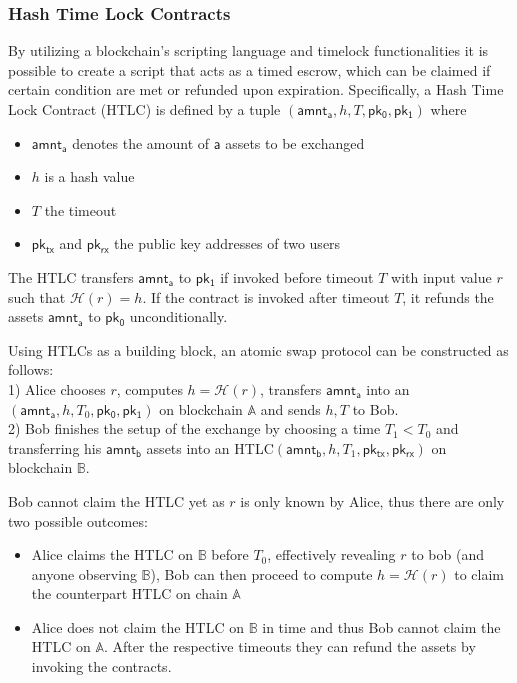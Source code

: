 \documentclass{article}      	%
\begin{document}
\subsubsection{Hash Time Lock Contracts}

By utilizing a blockchain's scripting language and timelock functionalities it is possible to create a script that acts as a timed escrow, which can be claimed if certain condition are met or refunded upon expiration.
Specifically, a Hash Time Lock Contract (HTLC) is defined by a tuple $(\mathsf{amnt_a}, h, T, \mathsf{pk_0}, \mathsf{pk_1})$ where 
\begin{itemize}
	\item $\mathsf{amnt_a}$ denotes the amount of $\mathsf{a}$ assets to be exchanged
	\item $h$ is a hash value
	\item $T$ the timeout
	\item $\mathsf{pk_{tx}}$ and $\mathsf{pk_{rx}}$ the public key addresses of two users
\end{itemize}

The HTLC transfers $\mathsf{amnt_a}$ to $\mathsf{pk_1}$ if invoked before timeout $T$ with input value $r$ such that $\mathcal{H}(r) = h$. 
If the contract is invoked after timeout $T$, it refunds the assets $\mathsf{amnt_a}$ to $\mathsf{pk_0}$ unconditionally.

Using HTLCs as a building block, an atomic swap protocol can be constructed as follows: \\
1) Alice chooses $r$, computes $h = \mathcal{H}(r)$, transfers $\mathsf{amnt_a}$ into an $(\mathsf{amnt_a}, h, T_0, \mathsf{pk_0}, \mathsf{pk_1})$ on blockchain $\mathbb{A}$ and sends $h,T$ to Bob. \\
2) Bob finishes the setup of the exchange by choosing a time $T_1 < T_0$ and transferring his $\mathsf{amnt_b}$ assets into an HTLC$(\mathsf{amnt_b}, h, T_1, \mathsf{pk_{tx}}, \mathsf{pk_{rx}})$ on blockchain $\mathbb{B}$. 

Bob cannot claim the HTLC yet as $r$ is only known by Alice, thus there are only two possible outcomes:
\begin{itemize}
\item Alice claims the HTLC on $\mathbb{B}$ before $T_0$, effectively revealing $r$ to bob (and anyone observing $\mathbb{B}$), Bob can then proceed to compute $h = \mathcal{H}(r)$ to claim the counterpart HTLC on chain $\mathbb{A}$ 
\item Alice does not claim the HTLC on $\mathbb{B}$ in time and thus Bob cannot claim the HTLC on $\mathbb{A}$. After the respective timeouts they can refund the assets by invoking the contracts.
\end{itemize}
\end{document}

